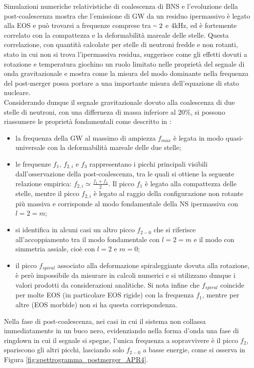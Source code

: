 Simulazioni numeriche relativistiche di coalescenza di BNS e l'evoluzione della post-coalescenza mostra che l'emissione di GW da un residuo ipermassivo è legato alla EOS e può trovarsi a frequenze comprese tra $\smallsim2$ e 4kHz, ed è fortemente correlato con la compattezza e la deformabilità mareale delle stelle. Questa correlazione, con quantità calcolate per stelle di neutroni fredde e non rotanti, stato in cui non si trova l'ipermassiva residua, suggerisce come gli effetti dovuti a rotazione e temperatura giochino un ruolo limitato nelle proprietà del segnale di onda gravitazionale e mostra come la misura del modo dominante nella frequenza del post-merger possa portare a una importante misura dell'equazione di stato nucleare\cite{sarin2020evolution}.\\
Considerando dunque il segnale gravitazionale dovuto alla coalescenza di due stelle di neutroni, con una differneza di massa inferiore al 20\%, si possono riassumere le proprietà fondamentali come descritto in \cite{Rezzolla_2016}:
\begin{itemize}
	\item la frequenza della GW al massimo di ampiezza $f_{max}$ è legata in modo quasi-universale con la deformabilità mareale delle due stelle;
	\item le frequenze $f_1$, $f_{2,i}$ e $f_3$ rappresentano i picchi principali visibili dall'osservazione della post-coalescenza, tra le quali si ottiene la seguente relazione empirica: $f_{2,i}\simeq\frac{f_1 + f_3}{2}$. Il picco $f_1$ è legato alla compattezza delle stelle, mentre il picco $f_{2,i}$ è legato al raggio della configurazione non rotante più massiva e corrisponde al modo fondamentale della NS ipermassiva con $l=2=m$;
	\item si identifica in alcuni casi un altro picco $f_{2-0}$ che si riferisce all'accoppiamento tra il modo fondamentale con $l=2=m$ e il modo con simmetria assiale, cioè con $l=2$ e $m=0$;
	\item il picco $f_{spiral}$ associato alla deformazione spiraleggiante dovuta alla rotazione, è però impossibile da misurare in calcoli numerici e si utilizzano dunque i valori prodotti da considerazioni analitiche. Si nota infine che $f_{spiral}$ coincide per molte EOS (in particolare EOS rigide) con la frequenza $f_1$, mentre per altre (EOS morbide) non si ha questa corrispondenza.
\end{itemize}

Nella fase di post-coalescenza, nei casi in cui il sistema non collassa immediatamente in un buco nero, evidenziando nella forma d'onda una fase di ringdown in cui il segnale si spegne, l'unica frequenza a sopravvivere è il picco $f_2$, spariscono gli altri picchi, lasciando solo $f_{2-0}$ a basse energie, come si osserva in Figura \ref{fig:spettrogramma_postmerger_APR4}.

